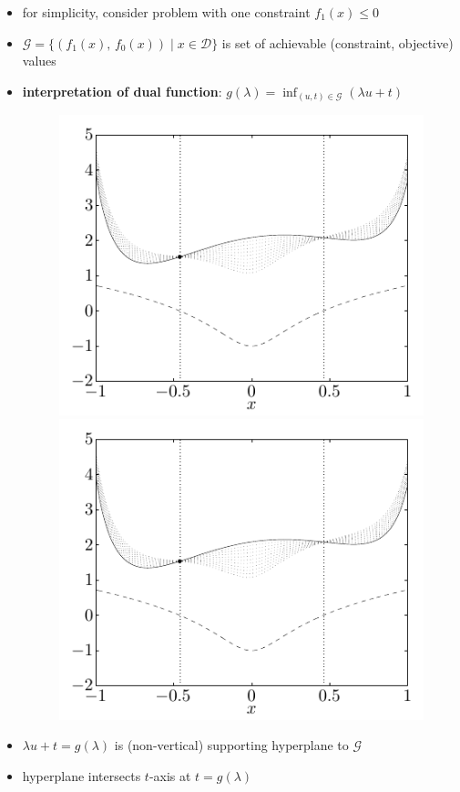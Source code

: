 \documentclass[11pt]{extarticle}
\newcommand{\ds}{\displaystyle}
\theoremstyle{definition}
\begin{document}
\begin{itemize}\setlength\itemsep{0em}
  \item for simplicity, consider problem with one constraint $\ds f_1(x)\leqslant 0$
  \item $\ds\mathcal{G} = \{(f_1(x),\,f_0(x))\;|\;x\in\mathcal{D}\}$ is set of achievable (constraint, objective) values
  \item {\bf interpretation of dual function}: $\ds g(\lambda) = \inf_{(u, t)\in\mathcal{G}} (\lambda u + t)$
    \begin{figure}[!htbp]
      \centering
      \includegraphics[scale=0.6,page=3]{fig/05.pdf}
      \includegraphics[scale=0.6,page=4]{fig/05.pdf}
    \end{figure}
  \item $\ds\lambda u + t = g(\lambda)$ is (non-vertical) supporting hyperplane to $\mathcal{G}$
  \item hyperplane intersects $t$-axis at $t = g(\lambda)$
\end{itemize}
\end{document}
